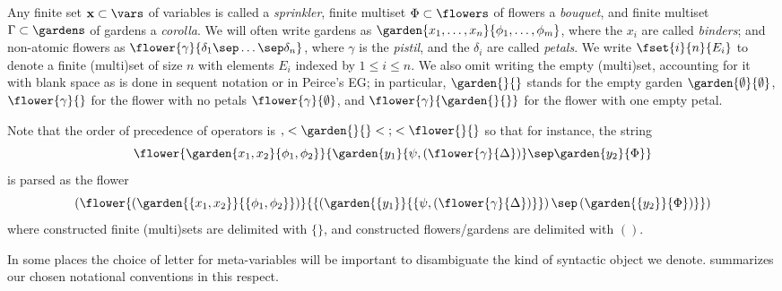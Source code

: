 Any finite set $\mathbf{x} \subset \vars$ of variables is called a
\emph{sprinkler}, finite multiset $\Phi \subset \flowers$ of flowers a
\emph{bouquet}, and finite multiset $\Gamma \subset \gardens$ of gardens a
\emph{corolla}. We will often write gardens as $\garden{x_1, \ldots,
x_n}{\phi_1, \ldots, \phi_m}$, where the $x_i$ are called \emph{binders}; and
non-atomic flowers as $\flower{\gamma}{\delta_1 \sep \ldots \sep \delta_n}$,
where $\gamma$ is the \emph{pistil}, and the $\delta_i$ are called
\emph{petals}. We write $\fset{i}{n}{E_i}$ to denote a finite (multi)set of
size $n$ with elements $E_i$ indexed by $1 \leq i \leq n$. We also omit
writing the empty (multi)set, accounting for it with blank space as is done in
sequent notation or in Peirce's EG; in particular, $\garden{{}}{{}}$ stands for
the empty garden $\garden{\emptyset}{\emptyset}$, $\flower{\gamma}{{}}$ for the
flower with no petals $\flower{\gamma}{\emptyset}$, and
$\flower{\gamma}{\garden{{}}{{}}}$ for the flower with one empty petal.

Note that the order of precedence of operators is
$\mathop{,} < \garden{{}}{{}} < \mathop{;} < \mathop{\flower{}{}}$
so that for instance, the string
$$\flower{\garden{x_1, x_2}{\phi_1, \phi_2}}{\garden{y_1}{\psi, (\flower{\gamma}{\Delta})} \sep \garden{y_2}{\Phi}}$$
is parsed as the flower
$$\left(\flower{\left(\garden{\{x_1, x_2\}}{\{\phi_1,
\phi_2\}}\right)}{\{\left(\garden{\{y_1\}}{\{\psi,
\left(\flower{\gamma}{\Delta}\right)\}}\right) \sep
\left(\garden{\{y_2\}}{\Phi}\right)\}}\right)$$ where constructed finite
(multi)sets are delimited with $\{\}$, and constructed flowers/gardens are
delimited with $()$.


\begin{remark}
  In some places the choice of letter for meta-variables will be important to
  disambiguate the kind of syntactic object we denote. 
  summarizes our chosen notational conventions in this respect.
\end{remark}

